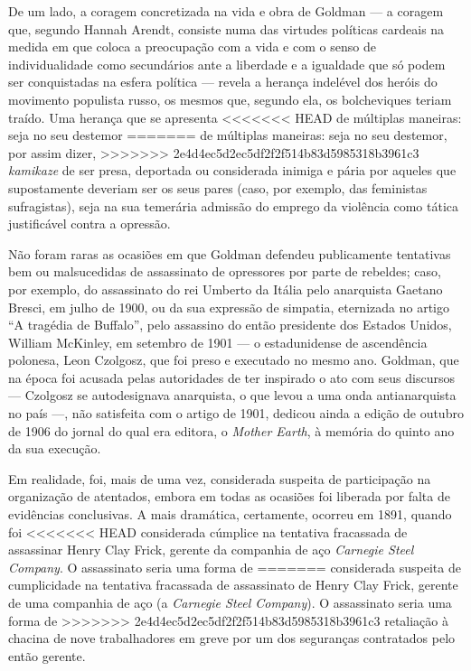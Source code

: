 De um lado, a coragem concretizada na vida e obra de Goldman --- a
coragem que, segundo Hannah Arendt, consiste numa das virtudes políticas
cardeais na medida em que coloca a preocupação com a vida e com o senso
de individualidade como secundários ante a liberdade e a igualdade que
só podem ser conquistadas na esfera política --- revela a herança
indelével dos heróis do movimento populista russo, os mesmos que,
segundo ela, os bolcheviques teriam traído. Uma herança que se apresenta
<<<<<<< HEAD
de múltiplas maneiras: seja no seu destemor
=======
de múltiplas maneiras: seja no seu destemor, por assim dizer,
>>>>>>> 2e4d4ec5d2ec5df2f2f514b83d5985318b3961c3
\textit{kamikaze} de ser presa, deportada ou considerada inimiga e pária por
aqueles que supostamente deveriam ser os seus pares (caso, por exemplo,
das feministas sufragistas), seja na sua temerária admissão do emprego
da violência como tática justificável contra a opressão.

Não foram raras
as ocasiões em que Goldman defendeu publicamente tentativas bem ou
malsucedidas de assassinato de opressores por parte de rebeldes; caso,
por exemplo, do assassinato do rei Umberto da Itália pelo anarquista
Gaetano Bresci, em julho de 1900, ou da sua expressão de simpatia,
eternizada no artigo ``A tragédia de Buffalo'', pelo assassino do então
presidente dos Estados Unidos, William McKinley, em setembro de 1901 ---
o estadunidense de ascendência polonesa, Leon Czolgosz, que foi preso e
executado no mesmo ano. Goldman, que na época foi acusada pelas
autoridades de ter inspirado o ato com seus discursos --- Czolgosz se
autodesignava anarquista, o que levou a uma onda antianarquista no país
---, não satisfeita com o artigo de 1901, dedicou ainda a edição de
outubro de 1906 do jornal do qual era editora, o \textit{Mother Earth}, à
memória do quinto ano da sua execução. 

Em realidade, foi, mais de uma
vez, considerada suspeita de participação na organização de atentados,
embora em todas as ocasiões foi liberada por falta de evidências
conclusivas. A mais dramática, certamente, ocorreu em 1891, quando foi
<<<<<<< HEAD
considerada cúmplice na tentativa fracassada de
assassinar Henry Clay Frick, gerente da companhia de aço
\emph{Carnegie Steel Company}. O assassinato seria uma forma de
=======
considerada suspeita de cumplicidade na tentativa fracassada de
assassinato de Henry Clay Frick, gerente de uma companhia de aço (a
\textit{Carnegie Steel Company}). O assassinato seria uma forma de
>>>>>>> 2e4d4ec5d2ec5df2f2f514b83d5985318b3961c3
retaliação à chacina de nove trabalhadores em greve por um dos
seguranças contratados pelo então gerente.

